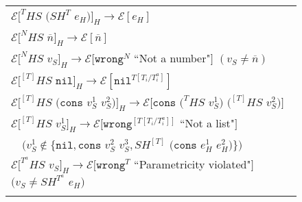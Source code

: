 \begin{figure}[p]
\centering
\begin{tabular}{l}
\vspace{5pt}

$\mathscr{E}[^{T}HS$ $(SH^{T}$ $e_{H})]_{H}\rightarrow\mathscr{E}[e_{H}]$ \\

\vspace{5pt}

$\mathscr{E}[^{N}HS$ $\overline{n}]_{H}\rightarrow\mathscr{E}[\overline{n}]$ \\

\vspace{5pt}

$\mathscr{E}[^{N}HS$ $v_{S}]_{H}\rightarrow\mathscr{E}[\mathtt{wrong}^{N}$ ``Not a number"$]$ $(v_{S}\neq\overline{n})$ \\

\vspace{5pt}

$\mathscr{E}[^{[T]}HS$ $\mathtt{nil}]_{H}\rightarrow\mathscr{E}[\mathtt{nil}^{T[T_{i}/T_{i}^{a}]}]$ \\

\vspace{5pt}

$\mathscr{E}[^{[T]}HS$ $(\mathtt{cons}$ $v_{S}^{1}$ $v_{S}^{2})]_{H}\rightarrow\mathscr{E}[\mathtt{cons}$ $(^{T}HS$ $v_{S}^{1})$ $(^{[T]}HS$ $v_{S}^{2})]$ \\

\vspace{5pt}

$\mathscr{E}[^{[T]}HS$ $v_{S}^{1}]_{H}\rightarrow\mathscr{E}[\mathtt{wrong}^{[T[T_{i}/T_{i}^{a}]]}$ ``Not a list"$]$ \\

\vspace{5pt}

$\quad(v_{S}^{1}\not\in\lbrace\mathtt{nil},\mathtt{cons}$ $v_{S}^{2}$ $v_{S}^{3},SH^{[T]}$ $(\mathtt{cons}$ $e_{H}^{1}$ $e_{H}^{2})\rbrace)$ \\

\vspace{5pt}

$\mathscr{E}[^{T^{a}}HS$ $v_{S}]_{H}\rightarrow\mathscr{E}[\mathtt{wrong}^{T}$ ``Parametricity violated"$]$ $(v_{S}\neq SH^{T^{a}}$ $e_{H})$ \\

\vspace{5pt}


\end{tabular}
\end{figure}
